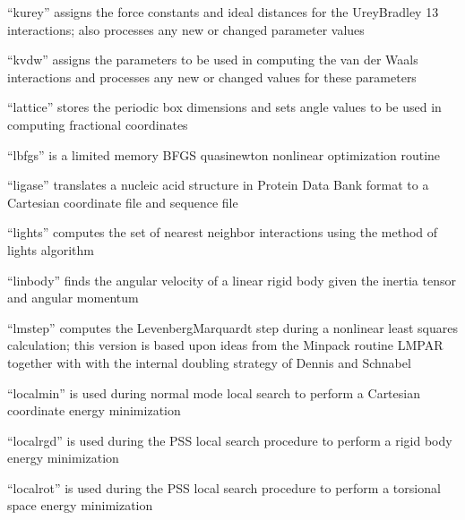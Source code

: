\documentclass[letterpaper,11pt,english]{sphinxmanual}
\begin{document}
“kurey” assigns the force constants and ideal distances for the Urey\sphinxhyphen{}Bradley 1\sphinxhyphen{}3 interactions; also processes any new or changed parameter values


“kvdw” assigns the parameters to be used in computing the van der Waals interactions and processes any new or changed values for these parameters


“lattice” stores the periodic box dimensions and sets angle values to be used in computing fractional coordinates


“lbfgs” is a limited memory BFGS quasi\sphinxhyphen{}newton nonlinear optimization routine


“ligase” translates a nucleic acid structure in Protein Data Bank format to a Cartesian coordinate file and sequence file


“lights” computes the set of nearest neighbor interactions using the method of lights algorithm


“linbody” finds the angular velocity of a linear rigid body given the inertia tensor and angular momentum


“lmstep” computes the Levenberg\sphinxhyphen{}Marquardt step during a nonlinear least squares calculation; this version is based upon ideas from the Minpack routine LMPAR together with with the internal doubling strategy of Dennis and Schnabel


“localmin” is used during normal mode local search to perform a Cartesian coordinate energy minimization


“localrgd” is used during the PSS local search procedure to perform a rigid body energy minimization


“localrot” is used during the PSS local search procedure to perform a torsional space energy minimization
\end{document}
